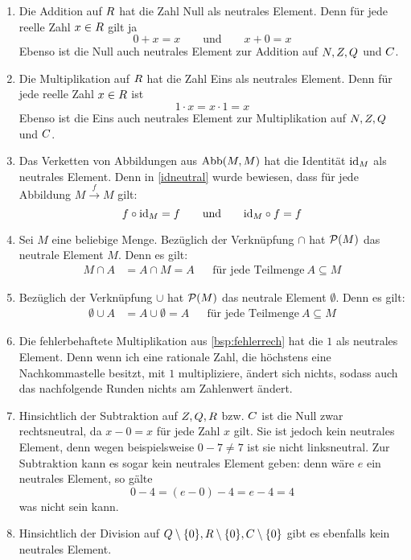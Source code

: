 \begin{bsp} \label{bsp:neutrales} \quad
    \begin{enumerate}
        \item Die Addition auf $\relax R$ hat die Zahl Null als neutrales Element. Denn für jede reelle Zahl $x\in \relax R$ gilt ja
            \[ 0+x=x \qquad\text{und}\qquad x+0=x \]
        Ebenso ist die Null auch neutrales Element zur Addition auf $\relax N,\relax Z,\relax Q$ und $\relax C$.
        \item Die Multiplikation auf $\relax R$ hat die Zahl Eins als neutrales Element. Denn für jede reelle Zahl $x\in \relax R$ ist
            \[ 1\cdot x = x\cdot 1= x \]
        Ebenso ist die Eins auch neutrales Element zur Multiplikation auf $\relax N,\relax Z,\relax Q$ und $\relax C$.
        \item Das Verketten von Abbildungen aus $\operatorname{Abb}(M,M)$ hat die Identität $\mathrm{id}_M$ als neutrales Element. Denn in \cref{idneutral} wurde bewiesen, dass für jede Abbildung $M\xrightarrow{f} M$ gilt:
            \[ f\circ \mathrm{id}_M = f \qquad\text{und}\qquad \mathrm{id}_M \circ f = f \]
        \item Sei $M$ eine beliebige Menge. Bezüglich der Verknüpfung $\cap$ hat $\mathcal P(M)$ das neutrale Element $M$. Denn es gilt:
        \begin{align*}
            M\cap A & = A\cap M = A && \text{für jede Teilmenge}\ A\subseteq M
        \end{align*}
        \item Bezüglich der Verknüpfung $\cup$ hat $\mathcal P(M)$ das neutrale Element $\emptyset$. Denn es gilt:
        \begin{align*}
            \emptyset\cup A & = A\cup \emptyset = A && \text{für jede Teilmenge}\ A\subseteq M
        \end{align*}
        \item Die fehlerbehaftete Multiplikation aus \cref{bsp:fehlerrech} hat die $1$ als neutrales Element. Denn wenn ich eine rationale Zahl, die höchstens eine Nachkommastelle besitzt, mit $1$ multipliziere, ändert sich nichts, sodass auch das nachfolgende Runden nichts am Zahlenwert ändert.
        \item Hinsichtlich der Subtraktion auf $\relax Z,\relax Q,\relax R$ bzw. $\relax C$ ist die Null zwar rechtsneutral, da $x-0=x$ für jede Zahl $x$ gilt. Sie ist jedoch kein neutrales Element, denn wegen beispielsweise $0-7\neq 7$ ist sie nicht linksneutral. Zur Subtraktion kann es sogar kein neutrales Element geben: denn wäre $e$ ein neutrales Element, so gälte
            \[ 0-4 = (e-0)-4 = e-4 = 4 \]
        was nicht sein kann.
        \item Hinsichtlich der Division auf $\relax Q\setminus \{0\},\relax R\setminus \{0\},\relax C\setminus \{0\}$ gibt es ebenfalls kein neutrales Element.
    \end{enumerate}
\end{bsp}


